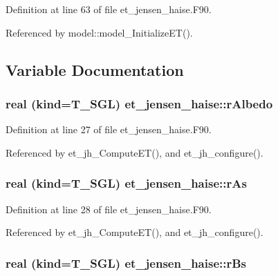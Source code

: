 Definition at line 63 of file et\_\-jensen\_\-haise.F90.



Referenced by model::model\_\-InitializeET().



\subsection{Variable Documentation}
\hypertarget{namespaceet__jensen__haise_a81532a18aa4ad4afc0670a30833834ac}{
\subsubsection[{rAlbedo}]{\setlength{\rightskip}{0pt plus 5cm}real (kind=T\_\-SGL) {\bf et\_\-jensen\_\-haise::rAlbedo}}}
\label{namespaceet__jensen__haise_a81532a18aa4ad4afc0670a30833834ac}


Definition at line 27 of file et\_\-jensen\_\-haise.F90.



Referenced by et\_\-jh\_\-ComputeET(), and et\_\-jh\_\-configure().

\hypertarget{namespaceet__jensen__haise_acfcbd3abba7d349d3eaf3ab277d4428e}{
\subsubsection[{rAs}]{\setlength{\rightskip}{0pt plus 5cm}real (kind=T\_\-SGL) {\bf et\_\-jensen\_\-haise::rAs}}}
\label{namespaceet__jensen__haise_acfcbd3abba7d349d3eaf3ab277d4428e}


Definition at line 28 of file et\_\-jensen\_\-haise.F90.



Referenced by et\_\-jh\_\-ComputeET(), and et\_\-jh\_\-configure().

\hypertarget{namespaceet__jensen__haise_a90836da6e648069d180faaf8d9f66a0e}{
\subsubsection[{rBs}]{\setlength{\rightskip}{0pt plus 5cm}real (kind=T\_\-SGL) {\bf et\_\-jensen\_\-haise::rBs}}}
\label{namespaceet__jensen__haise_a90836da6e648069d180faaf8d9f66a0e}


